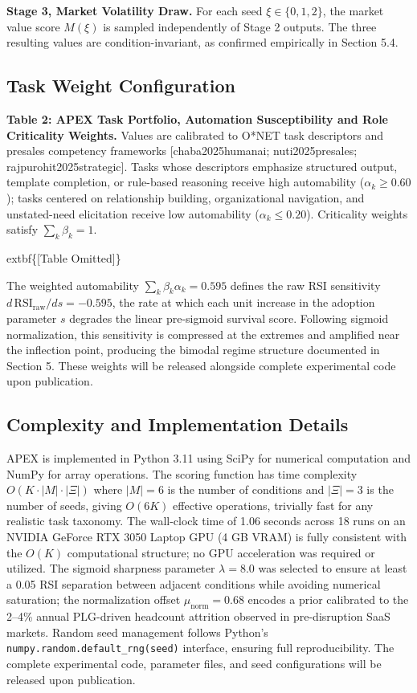 \documentclass[10pt, conference]{IEEEtran}
\begin{document}
\textbf{Stage 3, Market Volatility Draw.} For each seed $\xi \in \{0, 1, 2\}$, the market value score $M(\xi)$ is sampled independently of Stage 2 outputs. The three resulting values are condition-invariant, as confirmed empirically in Section 5.4.

\subsection{Task Weight Configuration}

\label{sec:task_weight_configuration}

\textbf{Table 2: APEX Task Portfolio, Automation Susceptibility and Role Criticality Weights.} Values are calibrated to O*NET task descriptors and presales competency frameworks [chaba2025humanai; nuti2025presales; rajpurohit2025strategic]. Tasks whose descriptors emphasize structured output, template completion, or rule-based reasoning receive high automability ($\alpha_k \geq 0.60$); tasks centered on relationship building, organizational navigation, and unstated-need elicitation receive low automability ($\alpha_k \leq 0.20$). Criticality weights satisfy $\sum_k \beta_k = 1$.

	extbf\{[Table Omitted]\}

The weighted automability $\sum_k \beta_k \alpha_k = 0.595$ defines the raw RSI sensitivity $d\,\text{RSI}_{\text{raw}}/ds = -0.595$, the rate at which each unit increase in the adoption parameter $s$ degrades the linear pre-sigmoid survival score. Following sigmoid normalization, this sensitivity is compressed at the extremes and amplified near the inflection point, producing the bimodal regime structure documented in Section 5. These weights will be released alongside complete experimental code upon publication.

\subsection{Complexity and Implementation Details}

\label{sec:complexity_and_implementation_details}

APEX is implemented in Python 3.11 using SciPy \cite{virtanen2020scipy} for numerical computation and NumPy for array operations. The scoring function has time complexity $O(K \cdot |M| \cdot |\Xi|)$ where $|M| = 6$ is the number of conditions and $|\Xi| = 3$ is the number of seeds, giving $O(6K)$ effective operations, trivially fast for any realistic task taxonomy. The wall-clock time of 1.06 seconds across 18 runs on an NVIDIA GeForce RTX 3050 Laptop GPU (4 GB VRAM) is fully consistent with the $O(K)$ computational structure; no GPU acceleration was required or utilized. The sigmoid sharpness parameter $\lambda = 8.0$ was selected to ensure at least a 0.05 RSI separation between adjacent conditions while avoiding numerical saturation; the normalization offset $\mu_{\text{norm}} = 0.68$ encodes a prior calibrated to the 2--4\% annual PLG-driven headcount attrition observed in pre-disruption SaaS markets. Random seed management follows Python's \texttt{numpy.random.default\_rng(seed)} interface, ensuring full reproducibility. The complete experimental code, parameter files, and seed configurations will be released upon publication.
\end{document}
